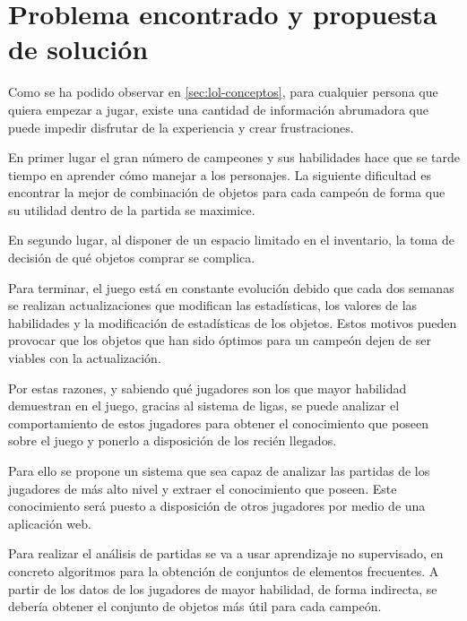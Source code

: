 


\section{Problema encontrado y propuesta de solución}
Como se ha podido observar en \ref{sec:lol-conceptos}, para cualquier persona que quiera empezar a jugar, existe una cantidad de información abrumadora que puede impedir disfrutar de la experiencia y crear frustraciones.

En primer lugar el gran número de campeones y sus habilidades hace que se tarde tiempo en aprender cómo manejar a los personajes. La siguiente dificultad es encontrar la mejor de combinación de objetos para cada campeón de forma que su utilidad dentro de la partida se maximice.

En segundo lugar, al disponer de un espacio limitado en el inventario, la toma de decisión de qué objetos comprar se complica.

Para terminar, el juego está en constante evolución debido que cada dos semanas se realizan actualizaciones que modifican las estadísticas, los valores de las habilidades y la modificación de estadísticas de los objetos. Estos motivos pueden provocar que los objetos que han sido óptimos para un campeón dejen de ser viables con la actualización.

Por estas razones, y sabiendo qué jugadores son los que mayor habilidad demuestran en el juego, gracias al sistema de ligas, se puede analizar el comportamiento de estos jugadores para obtener el conocimiento que poseen sobre el juego y ponerlo a disposición de los recién llegados.

Para ello se propone un sistema que sea capaz de analizar las partidas de los jugadores de más alto nivel y extraer el conocimiento que poseen. Este conocimiento será puesto a disposición de otros jugadores por medio de una aplicación web.

Para realizar el análisis de partidas se va a usar aprendizaje no supervisado, en concreto algoritmos para la obtención de conjuntos de elementos frecuentes. A partir de los datos de los jugadores de mayor habilidad, de forma indirecta, se debería obtener el conjunto de objetos más útil para cada campeón.

